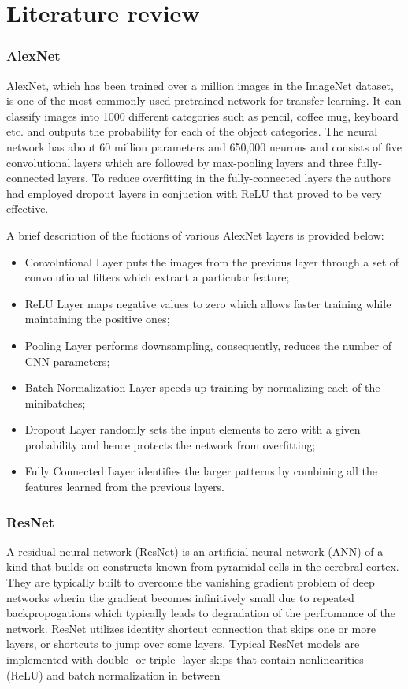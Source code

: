 \documentclass[doc/report.tex]{subfiles}
\begin{document}
\section{Literature review}

\subsubsection{AlexNet}
AlexNet\cite{Alex}, which has been trained over a million images in the
ImageNet dataset, is one of the most commonly used pretrained network for
transfer learning. It can classify images into 1000 different categories such
as pencil, coffee mug, keyboard etc. and outputs the probability for each of
the object categories. The neural network has about 60 million parameters and
650,000 neurons and consists of five convolutional layers which are followed by
max-pooling layers and three fully-connected layers. To reduce overfitting in
the fully-connected layers the authors had  employed dropout layers in
conjuction with ReLU that proved to be very effective.

A brief descriotion of the fuctions of various AlexNet layers is provided below:

\begin{itemize}
	\item Convolutional Layer puts the images from the previous layer through a set of convolutional filters which extract a particular feature;
	\item ReLU Layer maps negative values to zero which allows faster training while maintaining the positive ones;
	\item Pooling Layer performs downsampling, consequently, reduces the number of CNN parameters;
    	\item Batch Normalization Layer speeds up training by normalizing each of the minibatches;
    	\item Dropout Layer randomly sets the input elements to zero with a given probability and hence protects the network from overfitting;
    	\item Fully Connected Layer identifies the larger patterns by combining all the features learned from the previous layers.
\end{itemize}

\subsubsection{ResNet}
A residual neural network (ResNet) is an artificial neural network (ANN) of a kind that builds on constructs known from pyramidal cells in the cerebral cortex. They are typically built to overcome the vanishing gradient problem of deep networks wherin the gradient becomes infinitively small due to repeated backpropogations which typically leads to degradation of the perfromance of the network. ResNet utilizes identity shortcut connection that skips one or more layers, or shortcuts to jump over some layers. Typical ResNet models are implemented with double- or triple- layer skips that contain nonlinearities (ReLU) and batch normalization in between
\end{document}
